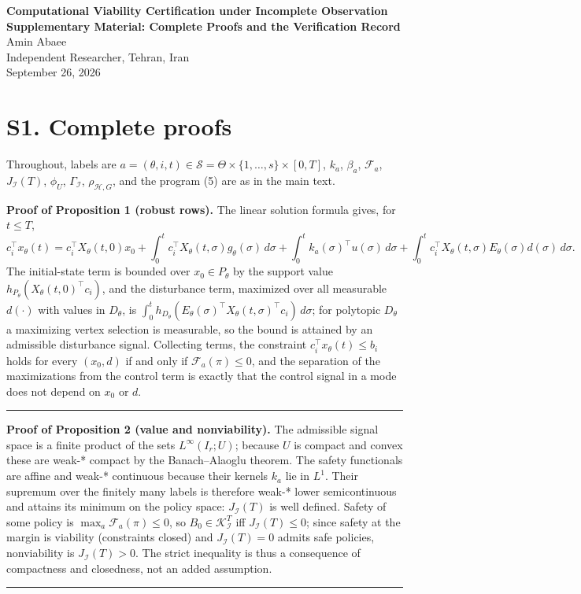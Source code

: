 \documentclass[10pt,article]{article}
\newcommand{\rulebar}{\begin{center}\rule{0.5\linewidth}{0.5pt}\end{center}}
\begin{document}
\begin{center}
{\Large\bfseries Computational Viability Certification under Incomplete Observation}\\[0.4em]
{\large\bfseries Supplementary Material: Complete Proofs and the Verification Record}\\[0.6em]
Amin Abaee\\
{\small Independent Researcher, Tehran, Iran}\\
{\small September 26, 2026}
\end{center}

\section*{S1. Complete proofs}

Throughout, labels are \(a = (\theta, i, t) \in \mathscr S = \Theta \times
\{1,\dots,s\} \times [0,T]\), \(k_a\), \(\beta_a\), \(\mathcal F_a\),
\(J_{\mathcal I}(T)\), \(\phi_U\), \(\Gamma_{\mathcal I}\),
\(\rho_{\mathcal H,G}\), and the program (5) are as in the main text.

\textbf{Proof of Proposition 1 (robust rows).} The linear solution formula
gives, for \(t \le T\),
\[
c_i^\top x_\theta(t) = c_i^\top X_\theta(t,0)x_0 + \int_0^t c_i^\top
X_\theta(t,\sigma) g_\theta(\sigma)\,d\sigma + \int_0^t k_a(\sigma)^\top
u(\sigma)\, d\sigma + \int_0^t c_i^\top X_\theta(t,\sigma)E_\theta(\sigma)
d(\sigma)\, d\sigma .
\]
The initial-state term is bounded over \(x_0 \in P_\theta\) by the support
value \(h_{P_\theta}(X_\theta(t,0)^\top c_i)\), and the disturbance term,
maximized over all measurable \(d(\cdot)\) with values in \(D_\theta\), is
\(\int_0^t h_{D_\theta}(E_\theta(\sigma)^\top X_\theta(t,\sigma)^\top
c_i)\, d\sigma\); for polytopic \(D_\theta\) a maximizing vertex selection is
measurable, so the bound is attained by an admissible disturbance signal.
Collecting terms, the constraint \(c_i^\top x_\theta(t) \le b_i\) holds for
every \((x_0, d)\) if and only if \(\mathcal F_a(\pi) \le 0\), and the
separation of the maximizations from the control term is exactly that the
control signal in a mode does not depend on \(x_0\) or \(d\).
\rulebar

\textbf{Proof of Proposition 2 (value and nonviability).} The admissible
signal space is a finite product of the sets \(L^\infty(I_r; U)\); because
\(U\) is compact and convex these are weak-* compact by the Banach--Alaoglu
theorem. The safety functionals are affine and weak-* continuous because
their kernels \(k_a\) lie in \(L^1\). Their supremum over the finitely many
labels is therefore weak-* lower semicontinuous and attains its minimum on
the policy space: \(J_{\mathcal I}(T)\) is well defined. Safety of some
policy is \(\max_a \mathcal F_a(\pi) \le 0\), so \(B_0 \in
\mathcal K_{\mathcal I}^T\) iff \(J_{\mathcal I}(T) \le 0\); since safety at
the margin is viability (constraints closed) and \(J_{\mathcal I}(T) = 0\)
admits safe policies, nonviability is \(J_{\mathcal I}(T) > 0\). The strict
inequality is thus a consequence of compactness and closedness, not an added
assumption.
\rulebar
\end{document}
